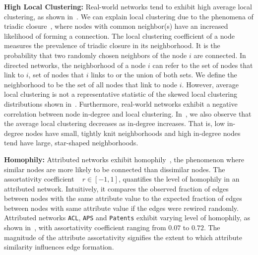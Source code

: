 \textbf{High Local Clustering:} Real-world networks tend to exhibit high average local clustering, as shown in~. We can explain local clustering due to the phenomena of triadic closure~\cite{simmel1950sociology,
newman2001clustering}, where nodes with common neighbor(s) have an increased
likelihood of forming a connection.
The local clustering coefficient of a node measures the prevalence of triadic closure in its neighborhood. It is the probability that two randomly chosen neighbors of the node $i$ are connected. In directed networks, the neighborhood of a node $i$ can refer to the
set of nodes that link to $i$, set of nodes that $i$ links to or the union of
both sets. We define the neighborhood to be the set of all nodes that link to
node $i$.  However, average local clustering is not a
representative statistic of the {skewed} local clustering distributions
shown in~. Furthermore, real-world networks exhibit a negative
correlation between node in-degree  and local clustering. In~, we
also observe that the average local clustering  decreases as in-degree increases.
That is, low in-degree nodes have small, tightly knit neighborhoods and high
in-degree nodes tend have large, star-shaped neighborhoods.



\textbf{Homophily:}
Attributed networks exhibit homophily~\cite{mcpherson2001birds}, the phenomenon where similar nodes are more likely
to be connected than dissimilar nodes. The assortativity coefficient
~\cite{newman2002assortative} $r \in [-1, 1]$,
quantifies the level of homophily in an attributed network. Intuitively, it
compares the observed fraction of edges between nodes with the same attribute
value to the expected fraction of edges between nodes with same attribute value
if the edges were rewired randomly.
Attributed networks \texttt{ACL}, \texttt{APS} and \texttt{Patents} exhibit
varying level of homophily, as shown in~, with assortativity
coefficient ranging from $0.07$ to $0.72$.
The magnitude of the attribute assortativity
signifies the extent to which attribute similarity influences edge formation.

